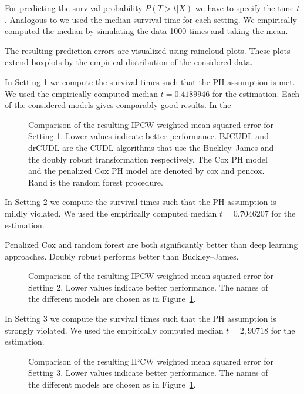\documentclass[12pt, a4paper]{scrartcl}
\theoremstyle{definition}
\theoremstyle{plain}
\numberwithin{equation}{section}
\numberwithin{figure}{section}
\numberwithin{table}{section}
\begin{document}
	For predicting the survival probability $P(T>t\vert X)$ we have to specify the time $t$.
	Analogous to \citet*{basearticle} we used the median survival time for each setting.
	We empirically computed the median by simulating the data 1000 times and taking the mean.%
	
	The resulting prediction errors are visualized using raincloud plots.
	These plots extend boxplots by the empirical distribution of the considered data.
	
	In Setting 1 we compute the survival times such that the PH assumption is met.
	We used the empirically computed median $t = 0.4189946$ for the estimation.
	Each of the considered models gives comparably good results.
	In the 
	\begin{figure}\label{setting1}
		\centering	
		
		\vspace{-0.3cm}
		\caption{Comparison of the resulting IPCW weighted mean squared error for Setting 1. Lower values indicate better performance. BJCUDL and drCUDL are the CUDL algorithms that use the Buckley--James and the doubly robust transformation respectively. The Cox PH model and the penalized Cox PH model are denoted by cox and pencox. Rand is the random forest procedure.}
 	\end{figure}
	
	In Setting 2 we compute the survival times such that the PH assumption is mildly violated.
	We used the empirically computed median $t = 0.7046207$ for the estimation.
	
	Penalized Cox and random forest are both significantly better than deep learning approaches.
	Doubly robust performs better than Buckley--James.
	
	\begin{figure}\label{setting2}
		\centering	
		
		\vspace{-0.3cm}
		\caption{Comparison of the resulting IPCW weighted mean squared error for Setting 2. Lower values indicate better performance. The names of the different models are chosen as in Figure~\ref{setting1}.}
	\end{figure}
	
	In Setting 3 we compute the survival times such that the PH assumption is strongly violated.
	We used the empirically computed median $t = 2,90718$ for the estimation.
	
	\begin{figure}\label{setting3}
		\centering	
		
		\vspace{-0.3cm}
		\caption{Comparison of the resulting IPCW weighted mean squared error for Setting 3. Lower values indicate better performance. The names of the different models are chosen as in Figure~\ref{setting1}.}
	\end{figure}
	
\end{document}
